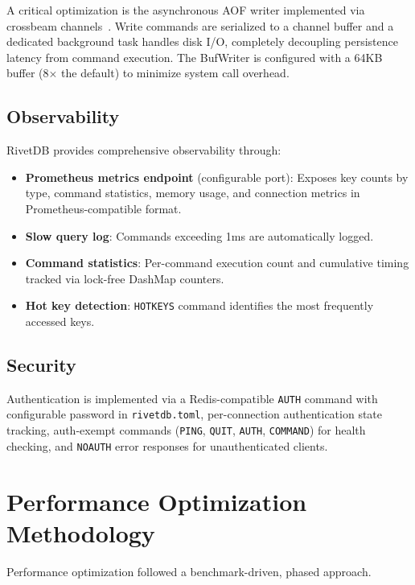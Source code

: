 \documentclass[conference,a4paper]{IEEEtran}
\begin{document}
A critical optimization is the asynchronous AOF writer implemented via crossbeam channels~\cite{yadav2024}. Write commands are serialized to a channel buffer and a dedicated background task handles disk I/O, completely decoupling persistence latency from command execution. The BufWriter is configured with a 64KB buffer (8$\times$ the default) to minimize system call overhead.

\subsection{Observability}

RivetDB provides comprehensive observability through:

\begin{itemize}
    \item \textbf{Prometheus metrics endpoint} (configurable port): Exposes key counts by type, command statistics, memory usage, and connection metrics in Prometheus-compatible format.
    \item \textbf{Slow query log}: Commands exceeding 1ms are automatically logged.
    \item \textbf{Command statistics}: Per-command execution count and cumulative timing tracked via lock-free DashMap counters.
    \item \textbf{Hot key detection}: \texttt{HOTKEYS} command identifies the most frequently accessed keys.
\end{itemize}

\subsection{Security}

Authentication is implemented via a Redis-compatible \texttt{AUTH} command with configurable password in \texttt{rivetdb.toml}, per-connection authentication state tracking, auth-exempt commands (\texttt{PING}, \texttt{QUIT}, \texttt{AUTH}, \texttt{COMMAND}) for health checking, and \texttt{NOAUTH} error responses for unauthenticated clients.

\section{Performance Optimization Methodology}

Performance optimization followed a benchmark-driven, phased approach.
\end{document}
